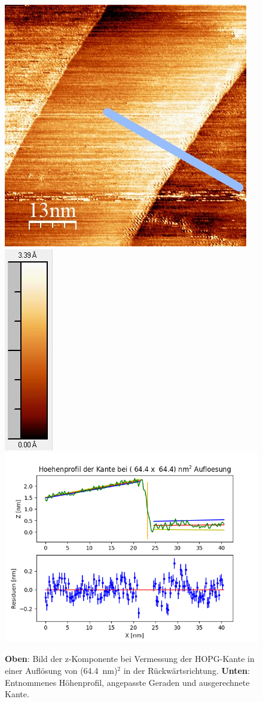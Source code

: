 \documentclass[12pt,a4paper]{article}
\begin{document}
\begin{figure}[H]
\centering
\includegraphics[scale=0.59]{Bilder/Anhang/Kante/0644_Kante_nach.jpg}
\includegraphics[scale=0.7]{Bilder/Anhang/Kante/0644_Kante_nach_Skala.jpg}
\includegraphics[scale=0.55]{Bilder/Anhang/Kante/Profil_Kante_0644_rueck.png}
\caption{\textbf{Oben}: Bild der z-Komponente bei Vermessung der HOPG-Kante in einer Auflösung von (\SI{64,4}{nm})$^2$ in der Rückwärtsrichtung. \textbf{Unten}: Entnommenes Höhenprofil, angepasste Geraden und ausgerechnete Kante.}
\end{figure}
\end{document}
